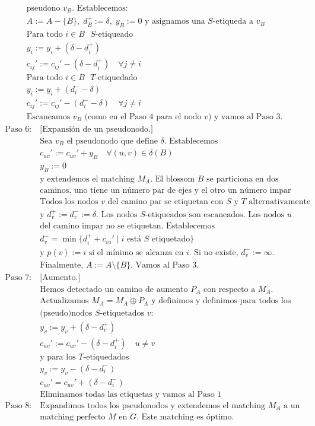\documentclass[twoside,a4paper,openright,12pt]{book}
\begin{document}
\begin{align*}
&\text{pseudono $v_B$. Establecemos:}\\
&A:=A-\{B\},\;d^+_B:=\delta,\;y_B:=0 \text{ y asignamos una $S$-etiqueda a $v_B$}\\
&\text{Para todo $i \in B$ $S$-etiqueado}\\
&y_i:=y_i + (\delta-d_i^+)\\
&c_{ij}' := c_{ij}' -(\delta-d_i^+) \quad \forall j\neq i\\
&\text{Para todo $i \in B$ $T$-etiquedado}\\
&y_i:=y_i + (d^-_i-\delta)\\
&c_{ij}' := c_{ij}' -(d_i^- -\delta) \quad \forall j\neq i\\
&\text{Escaneamos $v_B$ (como en el Paso 4 para el nodo $v$) y vamos al Paso 3.}
\end{align*}
\begin{align*}
\text{Paso 6: }&\text{[Expansión de un pseudonodo.]}\\
&\text{Sea $v_B$ el pseudonodo que define $\delta$. Establecemos}\\
&c_{uv}':=c_{uv}'+y_B\quad \forall (u,v)\in\delta(B)\\
&y_B:=0\\
&\text{y extendemos el matching $M_A$. El blossom $B$ se particiona en dos}\\
&\text{caminos, uno tiene un número par de ejes y el otro un número impar}\\
&\text{Todos los nodos $v$ del camino par se etiquetan con $S$ y $T$ alternativamente}\\
&\text{y $d_v^+:=d_v^-:=\delta$. Los nodos $S$-etiqueados son escaneados. Los nodos $u$}\\
&\text{del camino impar no se etiquetan. Establecemos}\\
&d^-_v=\min\{d_i^++c_{iu}'\mid i\text{ está $S$ etiquetado}\}\\
&\text{y $p(v):=i$ si el mínimo se alcanza en $i$. Si no existe, $d_v^-:=\infty$.}\\
&\text{Finalmente, $A:=A\setminus\{B\}$. Vamos al Paso 3.}\\
\text{Paso 7: }&\text{[Aumento.]}\\
&\text{Hemos detectado un camino de aumento $P_A$ con respecto a $M_A$.}\\
&\text{Actualizamos $M_A = M_A \oplus P_A$ y definimos y definimos para todos los}\\
&\text{(pseudo)nodos $S$-etiquetados $v$:}\\
&y_v:=y_v+(\delta-d_v^+)\\
&c_{uv}' := c_{uv}' - (\delta-d_i^+) \quad u\neq v\\
&\text{y para los $T$-etiquedados}\\
&y_v:=y_v-(\delta-d_i^-)\\
&c_{uv}'=c_{uv}'+(\delta-d_i^-)\\
&\text{Eliminamos todas las etiquetas y vamos al Paso 1}\\
\text{Paso 8: }& \text{Expandimos todos los pseudonodos y extendemos el matching $M_A$ a un}\\
&\text{matching perfecto $M$ en $G$. Este matching es óptimo.} 
\end{align*}
\newpage
\end{document}
